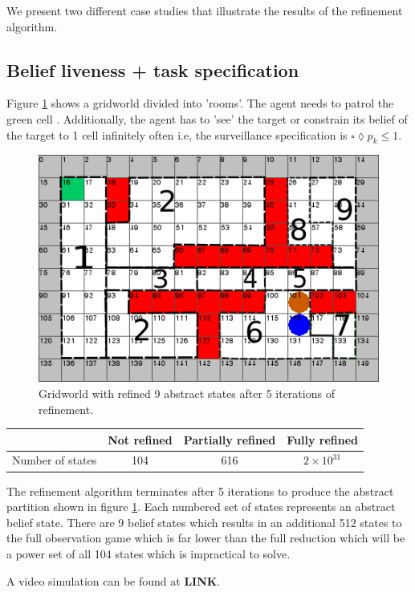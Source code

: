 We present two different case studies that illustrate the results of the refinement algorithm. 

\subsection{Belief liveness + task specification}
Figure \ref{fig:case1} shows a gridworld divided into 'rooms'. The agent needs to patrol the green cell . Additionally, the agent has to 'see' the target or constrain its belief of the target to 1 cell infinitely often i.e, the surveillance specification is $\square \lozenge p_k \leq 1$.

\begin{figure}
\centering
\includegraphics[scale=0.4]{text970.png}\caption{Gridworld with refined 9 abstract states after 5 iterations of refinement.}\label{fig:case1}
\end{figure}

\begin{table}[h!]
\begin{tabular}{c|c|c|c}
& Not refined & Partially refined & Fully refined \\ \hline \hline
Number of states & 104 & 616 & $2\times10^{31}$
\end{tabular}
\end{table}
The refinement algorithm terminates after 5 iterations to produce the abstract partition shown in figure \ref{fig:case1}. Each numbered set of states represents an abstract belief state. There are 9 belief states which results in an additional 512 states to the full observation game which is far lower than the full reduction which will be a power set of all 104 states which is impractical to solve.  

 A video simulation can be found at \textbf{LINK}. 


